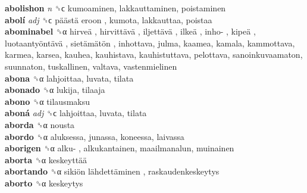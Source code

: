 \textbf{abolishon} \emph{n}  ␝ϲ  kumoaminen, lakkauttaminen, poistaminen  \\
\textbf{abolí} \emph{adj}  ␝ϲ   päästä eroon , kumota, lakkauttaa, poistaa  \\
\textbf{abominabel} ␝α   hirveä ,  hirvittävä ,  iljettävä ,  ilkeä ,  inho- ,  kipeä ,  luotaantyöntävä ,  sietämätön , inhottava, julma, kaamea, kamala, kammottava, karmea, karsea, kauhea, kauhistava, kauhistuttava, pelottava, sanoinkuvaamaton, suunnaton, tuskallinen, valtava, vastenmielinen  \\
\textbf{abona} ␝α  lahjoittaa, luvata, tilata  \\
\textbf{abonado} ␝α  lukija, tilaaja  \\
\textbf{abono} ␝α  tilausmaksu  \\
\textbf{aboná} \emph{adj}  ␝ϲ  lahjoittaa, luvata, tilata  \\
\textbf{aborda} ␝α  nousta  \\
\textbf{abordo} ␝α  aluksessa, junassa, koneessa, laivassa  \\
\textbf{aborigen} ␝α   alku- , alkukantainen, maailmanalun, muinainen  \\
\textbf{aborta} ␝α   keskeyttää   \\
\textbf{abortando} ␝α   sikiön lähdettäminen , raskaudenkeskeytys  \\
\textbf{aborto} ␝α  keskeytys  \\

